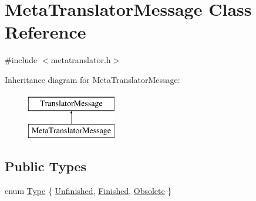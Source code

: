 \hypertarget{classMetaTranslatorMessage}{}\section{Meta\+Translator\+Message Class Reference}
\label{classMetaTranslatorMessage}


{\ttfamily \#include $<$metatranslator.\+h$>$}

Inheritance diagram for Meta\+Translator\+Message\+:\begin{figure}[H]
\begin{center}
\leavevmode
\includegraphics[height=2.000000cm]{classMetaTranslatorMessage}
\end{center}
\end{figure}
\subsection*{Public Types}
\begin{DoxyCompactItemize}
\item 
enum \hyperlink{classMetaTranslatorMessage_aa632f55202c89ec7fa02c7c3a6b8acc7}{Type} \{ \hyperlink{classMetaTranslatorMessage_aa632f55202c89ec7fa02c7c3a6b8acc7adfbe862cd6b227cd718a79d087bc61c7}{Unfinished}, 
\hyperlink{classMetaTranslatorMessage_aa632f55202c89ec7fa02c7c3a6b8acc7aa8ec53e1b3b5e8f9845905d729a2736a}{Finished}, 
\hyperlink{classMetaTranslatorMessage_aa632f55202c89ec7fa02c7c3a6b8acc7a6522ef3b5eff9c36516a62145fbd7856}{Obsolete}
 \}
\end{DoxyCompactItemize}
